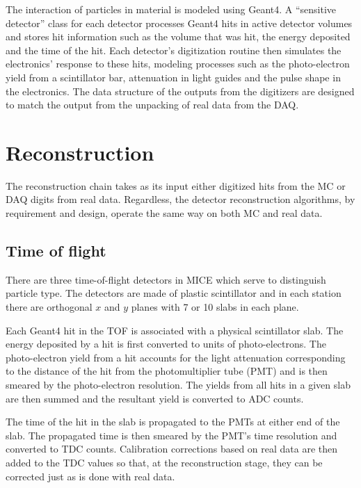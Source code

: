 \documentclass[11pt]{article}
\begin{document}
The interaction of particles in material is modeled using Geant4. A ``sensitive detector'' class for each detector processes Geant4 hits in active detector volumes and stores  hit information such as the volume that was hit, the energy deposited and the time of the hit. Each detector's digitization routine then simulates the electronics' response to these hits, modeling processes such as the photo-electron yield from a scintillator bar, attenuation in light guides and the pulse shape in the electronics. The data structure of the outputs from the digitizers are designed to match the output from the unpacking of real data from the DAQ.


\section{Reconstruction}\label{sec:recon}
The reconstruction chain takes as its input either digitized hits from the MC or DAQ digits from real data. Regardless, the detector reconstruction algorithms, by requirement and design, operate the same way on both MC and real data. 
%

\subsection{Time of flight}

There are three time-of-flight detectors in MICE which serve to distinguish particle type. The detectors are made of plastic scintillator and in each station there are orthogonal $x$ and $y$ planes with 7 or 10 slabs in each plane. 

Each Geant4 hit in the TOF is associated with a physical scintillator slab. The energy deposited by a hit is first converted to units of photo-electrons. The photo-electron yield from a hit accounts for the light attenuation corresponding to the distance of the hit from the photomultiplier tube (PMT) and is then smeared by the photo-electron resolution. The yields from all hits in a given slab are then summed and the resultant yield is converted to ADC counts.

The time of the hit in the slab is propagated to the PMTs at either end of the slab. The propagated time is then smeared by the PMT's time resolution and converted to TDC counts. Calibration corrections based on real data are then added to the TDC values so that, at the reconstruction stage, they can be corrected just as is done with real data.
\end{document}
